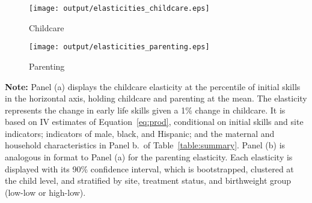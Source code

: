 \begin{sidewaysfigure}
\centering
\caption{Main Estimates: Elasticities Across the Distribution of Initial Skills} \label{figure:mainestimates}
\begin{subfigure}[h]{0.5\textwidth}
	\centering
	\caption{Childcare}  
	\texttt{[image: output/elasticities\_childcare.eps]}
\end{subfigure}%
\begin{subfigure}[h]{0.5\textwidth}
	\centering
	\caption{Parenting} 
	\texttt{[image: output/elasticities\_parenting.eps]}
\end{subfigure}
\footnotesize
\justify
\textbf{Note:} Panel (a) displays the childcare elasticity at the percentile of initial skills in the horizontal axis, holding childcare and parenting at the mean. The elasticity represents the change in early life skills given a 1\% change in childcare. It is based on IV estimates of Equation~\eqref{eq:prod}, conditional on initial skills and site indicators; indicators of male, black, and Hispanic; and the maternal and household characteristics in Panel b.\ of Table~\ref{table:summary}. Panel (b)  is analogous in format to Panel (a) for the parenting elasticity. Each elasticity is displayed with its 90\% confidence interval, which is bootstrapped, clustered at the child level, and stratified by site, treatment status, and birthweight group (low-low or high-low).
\end{sidewaysfigure}

